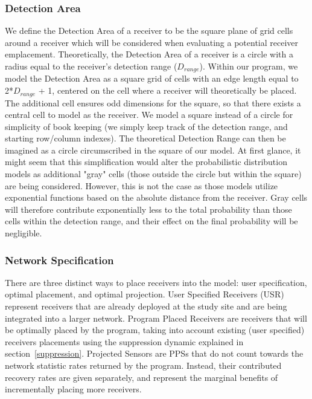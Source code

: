 \subsubsection{Detection Area}
We define the Detection Area of a receiver to be the square plane of grid cells around a receiver which will be considered when evaluating a potential receiver emplacement.  Theoretically, the Detection Area of a receiver is a circle with a radius equal to the receiver's detection range ($D_{range}$).  Within our program, we model the Detection Area as a square grid of cells with an edge length equal to 2*$D_{range}$ + 1, centered on the cell where a receiver will theoretically be placed.  The additional cell ensures odd dimensions for the square, so that there exists a central cell to model as the receiver.  We model a square instead of a circle for simplicity of book keeping (we simply keep track of the detection range, and starting row/column indexes).  The theoretical Detection Range can then be imagined as a circle circumscribed in the square of our model.  At first glance, it might seem that this simplification would alter the probabilistic distribution models as additional "gray" cells (those outside the circle but within the square) are being considered.  However, this is not the case as those models utilize exponential functions based on the absolute distance from the receiver.  Gray cells will therefore contribute exponentially less to the total probability than those cells within the detection range, and their effect on the final probability will be negligible.  

\subsubsection{Network Specification}
There are three distinct ways to place receivers into the model: user specification, optimal placement, and optimal projection.  User Specified Receivers (USR) represent receivers that are already deployed at the study site and are being integrated into a larger network.    Program Placed Receivers are receivers that will be  optimally placed by the program, taking into account existing (user specified) receivers placements using the suppression dynamic explained in section~\ref{suppression}.  Projected Sensors are PPSs that do not count towards the network statistic rates returned by the program.  Instead, their contributed recovery rates are given separately, and represent the marginal benefits of incrementally placing more receivers.  


